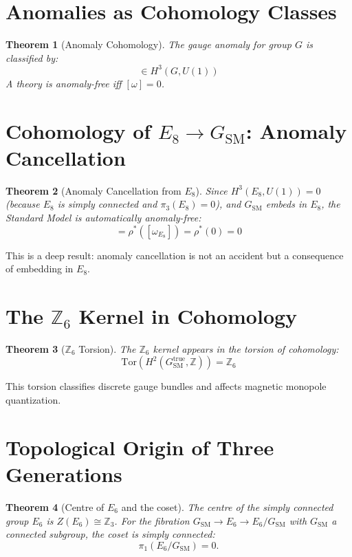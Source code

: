 \documentclass[11pt,a4paper,openright]{book}
\theoremstyle{plain}
\newtheorem{theorem}{Theorem}[chapter]
\theoremstyle{definition}
\newcommand{\SM}{\mathrm{SM}}
\newcommand{\Z}{\mathbb{Z}}
\begin{document}
\section{Anomalies as Cohomology Classes}

\begin{theorem}[Anomaly Cohomology]
The gauge anomaly for group $G$ is classified by:
\begin{equation}
[\omega] \in H^3(G, U(1))
\end{equation}
A theory is anomaly-free iff $[\omega] = 0$.
\end{theorem}

\section{Cohomology of $E_8 \to G_{\SM}$: Anomaly Cancellation}

\begin{theorem}[Anomaly Cancellation from $E_8$]
Since $H^3(E_8, U(1)) = 0$ (because $E_8$ is simply connected and $\pi_3(E_8) = 0$), and $G_{\SM}$ embeds in $E_8$, the Standard Model is automatically anomaly-free:
\begin{equation}
[\omega_{\SM}] = \rho^*([\omega_{E_8}]) = \rho^*(0) = 0
\end{equation}
\end{theorem}

This is a deep result: anomaly cancellation is not an accident but a consequence of embedding in $E_8$.

\section{The $\Z_6$ Kernel in Cohomology}

\begin{theorem}[$\Z_6$ Torsion]
The $\Z_6$ kernel appears in the torsion of cohomology:
\begin{equation}
\mathrm{Tor}(H^2(G_{\SM}^{\mathrm{true}}, \Z)) = \Z_6
\end{equation}
\end{theorem}

This torsion classifies discrete gauge bundles and affects magnetic monopole quantization.

\section{Topological Origin of Three Generations}

\begin{theorem}[Centre of $E_6$ and the coset]
The centre of the simply connected group $E_6$ is $Z(E_6) \cong \Z_3$. For the fibration $G_{\SM} \to E_6 \to E_6/G_{\SM}$ with $G_{\SM}$ a connected subgroup, the coset is simply connected:
\begin{equation}
\pi_1(E_6/G_{\SM}) = 0.
\end{equation}
\end{theorem}
\end{document}
